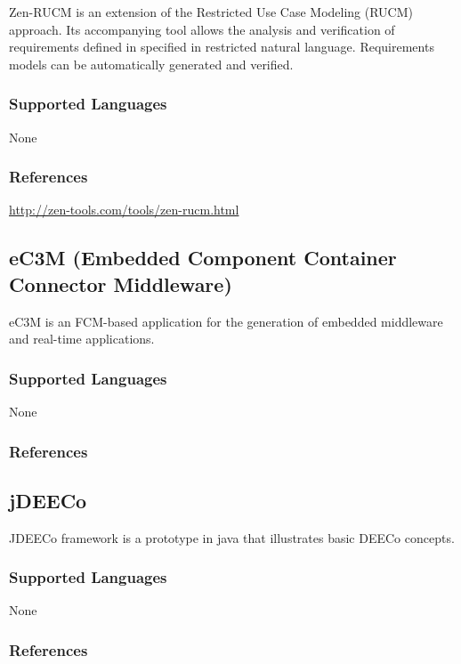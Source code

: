 Zen-RUCM is an extension of the Restricted Use Case Modeling (RUCM) approach.
Its accompanying tool allows the analysis and verification of requirements defined in specified in restricted natural language.
Requirements models can be automatically generated and verified.

\subsubsection{Supported Languages}

None


\subsubsection{References}

\url{http://zen-tools.com/tools/zen-rucm.html}



\subsection{eC3M (Embedded Component Container Connector Middleware)}
\label{subsecT:eC3M}



eC3M is an FCM-based application for the generation of embedded middleware and real-time applications.


\subsubsection{Supported Languages}

None


\subsubsection{References}





\subsection{jDEECo}
\label{subsecT:jDEECo}

JDEECo framework is a prototype in java that illustrates basic DEECo concepts.

\subsubsection{Supported Languages}

None


\subsubsection{References}
